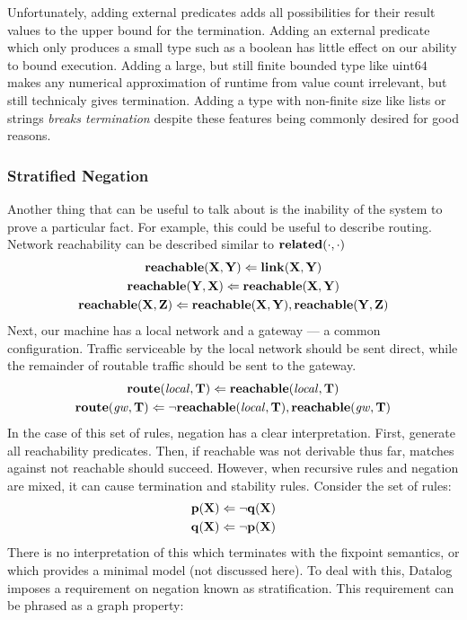 Unfortunately, adding external predicates adds all possibilities for their result values to the upper bound for the termination.
Adding an external predicate which only produces a small type such as a boolean has little effect on our ability to bound execution.
Adding a large, but still finite bounded type like $\textrm{uint64}$ makes any numerical approximation of runtime from value count irrelevant, but still technicaly gives termination.
Adding a type with non-finite size like lists or strings \emph{breaks termination} despite these features being commonly desired for good reasons.

\subsubsection{Stratified Negation}
Another thing that can be useful to talk about is the inability of the system to prove a particular fact.
For example, this could be useful to describe routing.
Network reachability can be described similar to ${\bf related}(\cdot, \cdot)$
\begin{gather*}
        {\bf reachable}({\bf X}, {\bf Y}) \Leftarrow {\bf link}({\bf X}, {\bf Y})\\
        {\bf reachable}({\bf Y}, {\bf X}) \Leftarrow {\bf reachable}({\bf X}, {\bf Y})\\
        {\bf reachable}({\bf X}, {\bf Z}) \Leftarrow {\bf reachable}({\bf X}, {\bf Y}), {\bf reachable}({\bf Y}, {\bf Z})
\end{gather*}
Next, our machine has a local network and a gateway --- a common configuration.
Traffic serviceable by the local network should be sent direct, while the remainder of routable traffic should be sent to the gateway.
\begin{gather*}
        {\bf route}({\it local}, {\bf T}) \Leftarrow {\bf reachable}({\it local}, {\bf T})\\
        {\bf route}({\it gw}, {\bf T}) \Leftarrow \neg {\bf reachable}({\it local}, {\bf T}), {\bf reachable}({\it gw}, {\bf T})
\end{gather*}
In the case of this set of rules, negation has a clear interpretation.
First, generate all reachability predicates.
Then, if reachable was not derivable thus far, matches against not reachable should succeed.
However, when recursive rules and negation are mixed, it can cause termination and stability rules. Consider the set of rules:
\begin{gather*}
        {\bf p}({\bf X}) \Leftarrow \neg {\bf q}({\bf X})\\
        {\bf q}({\bf X}) \Leftarrow \neg {\bf p}({\bf X})
\end{gather*}
There is no interpretation of this which terminates with the fixpoint semantics, or which provides a minimal model (not discussed here).
To deal with this, Datalog imposes a requirement on negation known as stratification.
This requirement can be phrased as a graph property:

